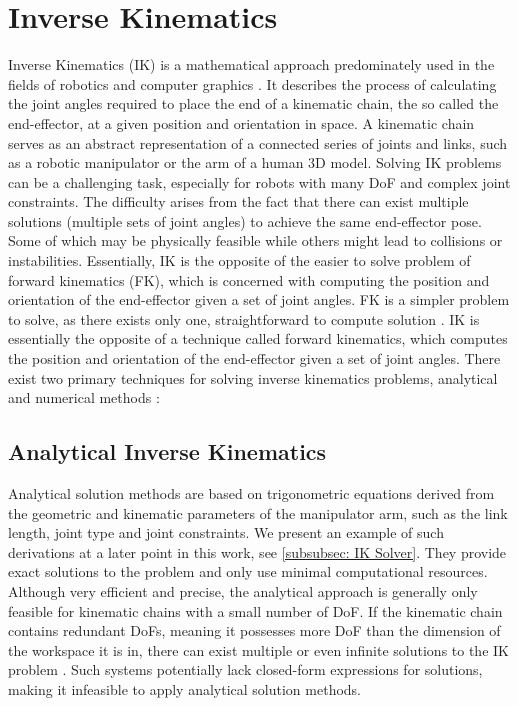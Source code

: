 \section{Inverse Kinematics}
Inverse Kinematics (IK) is a mathematical approach predominately used in the fields of robotics and computer graphics \parencite{AristidouFABRIK}.
It describes the process of calculating the joint angles required to place the end of a kinematic chain, the so called the end-effector, at a given position and orientation in space.
A kinematic chain serves as an abstract representation of a connected series of joints and links, such as a robotic manipulator or the arm of a human 3D model.
Solving IK problems can be a challenging task, especially for robots with many DoF and complex joint constraints.
The difficulty arises from the fact that there can exist multiple solutions (multiple sets of joint angles) to achieve the same end-effector pose.
Some of which may be physically feasible while others might lead to collisions or instabilities.
Essentially, IK is the opposite of the easier to solve problem of forward kinematics (FK), which is concerned with computing the position and orientation of the end-effector given a set of joint angles.
FK is a simpler problem to solve, as there exists only one, straightforward to compute solution \parencite{inverseKinematicsIllinois}.
 IK is essentially the opposite of a technique called forward kinematics, which computes the position and orientation of the end-effector given a set of joint angles.
There exist two primary techniques for solving inverse kinematics problems, analytical and numerical methods \parencite{inverseKinematicsIllinois}:

\subsection{Analytical Inverse Kinematics}
Analytical solution methods are based on trigonometric equations derived from the geometric and kinematic parameters of the manipulator arm, such as the link length, joint type and joint constraints.
We present an example of such derivations at a later point in this work, see \ref{subsubsec: IK Solver}.
They provide exact solutions to the problem and only use minimal computational resources.
Although very efficient and precise, the analytical approach is generally only feasible for kinematic chains with a small number of DoF.
If the kinematic chain contains redundant DoFs, meaning it possesses more DoF than the dimension of the workspace it is in, there can exist multiple or even infinite solutions to the IK problem \parencite{inverseKinematicsIllinois}.
Such systems potentially lack closed-form expressions for solutions, making it infeasible to apply analytical solution methods.

